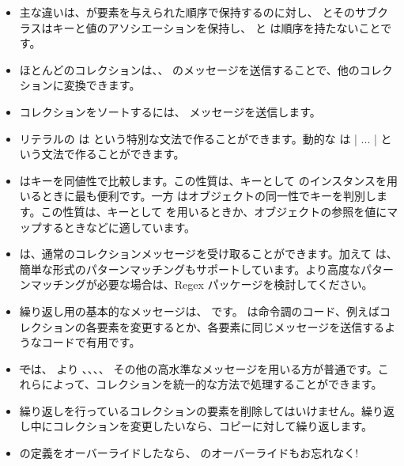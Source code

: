 \documentclass[a4paper,10pt,twoside]{book}
\begin{document}
\begin{itemize}
  \item 主な違いは、が要素を与えられた順序で保持するのに対し、 とそのサブクラスはキーと値のアソシエーションを保持し、 と は順序を持たないことです。
  \item ほとんどのコレクションは、、 \etc のメッセージを送信することで、他のコレクションに変換できます。
  \item コレクションをソートするには、 メッセージを送信します。
  \item リテラルの  は  という特別な文法で作ることができます。動的な  は \ct|{ ... }| という文法で作ることができます。
  \item {} はキーを同値性で比較します。この性質は、キーとして  のインスタンスを用いるときに最も便利です。一方 はオブジェクトの同一性でキーを判別します。この性質は、キーとして  を用いるときか、オブジェクトの参照を値にマップするときなどに適しています。%
  \item {} は、通常のコレクションメッセージを受け取ることができます。加えて は、簡単な形式のパターンマッチングもサポートしています。より高度なパターンマッチングが必要な場合は、Regex パッケージを検討してください。
  \item 繰り返し用の基本的なメッセージは、 です。 は命令調のコード、例えばコレクションの各要素を変更するとか、各要素に同じメッセージを送信するようなコードで有用です。
  \item \st では、 より 、、、、 その他の高水準なメッセージを用いる方が普通です。これらによって、コレクションを統一的な方法で処理することができます。
  \item 繰り返しを行っているコレクションの要素を削除してはいけません。繰り返し中にコレクションを変更したいなら、コピーに対して繰り返します。
  \item \ct{=} の定義をオーバーライドしたなら、 のオーバーライドもお忘れなく!
\end{itemize}

\ifx\wholebook\relax\else
   
   
\end{document}
